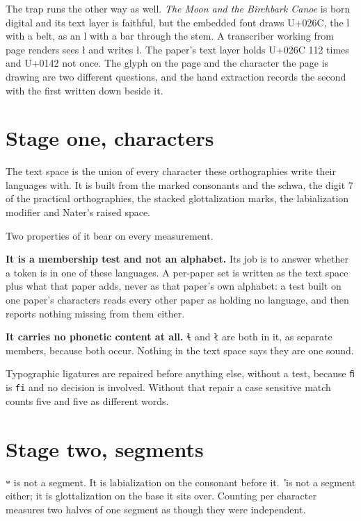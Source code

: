 The trap runs the other way as well. \emph{The Moon and the Birchbark Canoe} \cite{src:Givens-and-Hall-2023} is born digital and its
text layer is faithful, but the embedded font draws U+026C, the l with a belt, as an l with a bar
through the stem. A transcriber working from page renders sees ł and writes ł. The paper's text
layer holds U+026C 112 times and U+0142 not once. The glyph on the page and the character the page
is drawing are two different questions, and the hand extraction records the second with the first
written down beside it.

\section{Stage one, characters}

The text space is the union of every character these orthographies write their languages with. It
is built from the marked consonants and the schwa, the digit 7 of the practical orthographies, the
stacked glottalization marks, the labialization modifier and Nater's raised space.

Two properties of it bear on every measurement.

\textbf{It is a membership test and not an alphabet.} Its job is to answer whether a token is in one
of these languages. A per-paper set is written as the text space plus what that paper adds, never as
that paper's own alphabet: a test built on one paper's characters reads every other paper as holding
no language, and then reports nothing missing from them either.

\textbf{It carries no phonetic content at all.} \texttt{ɬ} and \texttt{ł} are both in it, as separate
members, because both occur. Nothing in the text space says they are one sound.

Typographic ligatures are repaired before anything else, without a test, because \texttt{ﬁ} is
\texttt{fi} and no decision is involved. Without that repair a case sensitive match counts five and
ﬁve as different words.

\section{Stage two, segments}

\texttt{ʷ} is not a segment. It is labialization on the consonant before it. \texttt{̓} is not a
segment either; it is glottalization on the base it sits over. Counting per character measures two
halves of one segment as though they were independent.

